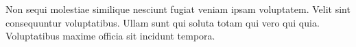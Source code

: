 
Non sequi molestiae similique nesciunt fugiat veniam ipsam voluptatem. Velit sint consequuntur voluptatibus. Ullam sunt qui soluta totam qui vero qui quia. Voluptatibus maxime officia sit incidunt tempora.
